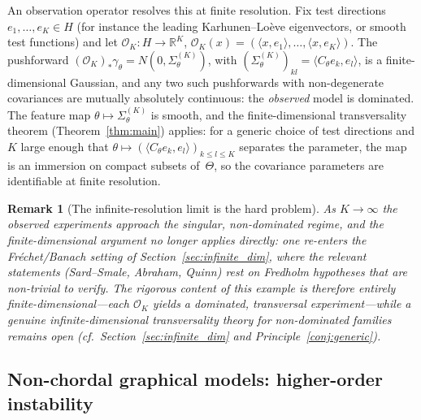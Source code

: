 \documentclass[11pt,a4paper]{article}
\newtheorem{remark}[theorem]{Remark}
\newcommand{\R}{\mathbb{R}}
\begin{document}
An observation operator resolves this at finite resolution.  Fix test
directions $e_1,\dots,e_K\in H$ (for instance the leading Karhunen--Lo\`eve
eigenvectors, or smooth test functions) and let $\mathcal O_K:H\to\R^K$,
$\mathcal O_K(x)=(\langle x,e_1\rangle,\dots,\langle x,e_K\rangle)$.  The
pushforward $(\mathcal O_K)_*\gamma_\theta = N(0,\Sigma_\theta^{(K)})$, with
$(\Sigma_\theta^{(K)})_{kl}=\langle C_\theta e_k,e_l\rangle$, is a
finite-dimensional Gaussian, and any two such pushforwards with non-degenerate
covariances are mutually absolutely continuous: the \emph{observed} model is
dominated.  The feature map $\theta\mapsto\Sigma_\theta^{(K)}$ is smooth, and
the finite-dimensional transversality theorem (Theorem~\ref{thm:main}) applies:
for a generic choice of test directions and $K$ large enough that
$\theta\mapsto(\langle C_\theta e_k,e_l\rangle)_{k\le l\le K}$ separates the
parameter, the map is an immersion on compact subsets of~$\Theta$, so the
covariance parameters are identifiable at finite resolution.

\begin{remark}[The infinite-resolution limit is the hard problem]
\label{rem:infinite_resolution}
As $K\to\infty$ the observed experiments approach the singular, non-dominated
regime, and the finite-dimensional argument no longer applies directly: one
re-enters the Fr\'echet/Banach setting of Section~\ref{sec:infinite_dim}, where
the relevant statements (Sard--Smale, Abraham, Quinn) rest on Fredholm
hypotheses that are non-trivial to verify.  The rigorous content of this
example is therefore entirely finite-dimensional---each $\mathcal O_K$ yields a
dominated, transversal experiment---while a genuine \emph{infinite-dimensional}
transversality theory for non-dominated families remains open
(cf.\ Section~\ref{sec:infinite_dim} and Principle~\ref{conj:generic}).
\end{remark}


\subsection{Non-chordal graphical models: higher-order instability}
\label{sec:graphical}
\end{document}
